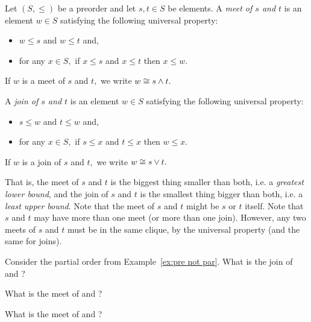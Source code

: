 \documentclass[CT4S-EN-RU]{subfiles}
\begin{document}
\begin{definitionENG}\label{def:meets and joins}
Let $(S,\leq)$ be a preorder and let $s,t\in S$ be elements. A {\em meet of $s$ and $t$} is an element $w\in S$ satisfying the following universal property: 
\begin{itemize}
\item $w\leq s$ and $w\leq t$ and, 
\item for any $x\in S,$ if $x\leq s$ and $x\leq t$ then $x\leq w.$
\end{itemize}
If $w$ is a meet of $s$ and $t,$ we write $w\cong s\wedge t.$

A {\em join of $s$ and $t$} is an element $w\in S$ satisfying the following universal property: 
\begin{itemize}
\item $s\leq w$ and $t\leq w$ and, 
\item for any $x\in S,$ if $s\leq x$ and $t\leq x$ then $w\leq x.$
\end{itemize}
If $w$ is a join of $s$ and $t,$ we write $w\cong s\vee t.$
\end{definitionENG}

\begin{definitionRUS}\label{def:meets and joins}
\end{definitionRUS}

\begin{blockENG}
That is, the meet of $s$ and $t$ is the biggest thing smaller than both, i.e. a {\em greatest lower bound}, and the join of $s$ and $t$ is the smallest thing bigger than both, i.e. a {\em least upper bound}. Note that the meet of $s$ and $t$ might be $s$ or $t$ itself.  Note that $s$ and $t$ may have more than one meet (or more than one join). However, any two meets of $s$ and $t$ must be in the same clique, by the universal property (and the same for joins).
\end{blockENG}

\begin{blockRUS}
\end{blockRUS}

\begin{exerciseENG}
Consider the partial order from Example~\ref{ex:pre not par}. 
\sexc What is the join of  and ? 
\item What is the meet of  and ? 
\item What is the meet of  and ?
\endsexc
\end{exerciseENG}
\end{document}
